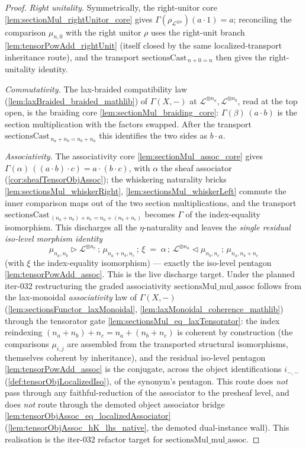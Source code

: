 \begin{proof}
  \emph{Right unitality.} Symmetrically, the right-unitor core
  \cref{lem:sectionMul_rightUnitor_core} gives
  \(\Gamma(\rho_{\mathcal{L}^{\otimes n}})(a \cdot 1) = a\); reconciling the
  comparison \(\mu_{n,0}\) with the right unitor \(\rho\) uses the right-unit branch
  \cref{lem:tensorPowAdd_rightUnit} (itself closed by the same localized-transport
  inheritance route), and the transport \(\mathrm{sectionsCast}_{\,n+0=n}\) then
  gives the right-unitality identity.

  \emph{Commutativity.} The lax-braided compatibility law
  (\cref{lem:laxBraided_braided_mathlib}) of \(\Gamma(X,-)\) at
  \(\mathcal{L}^{\otimes n_a}, \mathcal{L}^{\otimes n_b}\), read at the top open, is
  the braiding core \cref{lem:sectionMul_braiding_core}:
  \(\Gamma(\beta)\,(a \cdot b)\) is the section multiplication with the factors
  swapped. After the transport \(\mathrm{sectionsCast}_{\,n_a+n_b=n_b+n_a}\) this
  identifies the two sides as \(b \cdot a\).

  \emph{Associativity.} The associativity core \cref{lem:sectionMul_assoc_core}
  gives \(\Gamma(\alpha)\,((a \cdot b) \cdot c) = a \cdot (b \cdot c)\), with
  \(\alpha\) the sheaf associator (\cref{cor:sheafTensorObjAssoc}); the whiskering
  naturality bricks \cref{lem:sectionsMul_whiskerRight},
  \cref{lem:sectionsMul_whiskerLeft} commute the inner comparison maps out of the
  two section multiplications, and the transport
  \(\mathrm{sectionsCast}_{\,(n_a+n_b)+n_c = n_a+(n_b+n_c)}\) becomes \(\Gamma\) of
  the index-equality isomorphism. This discharges all the \(\eta\)-naturality and
  leaves the \emph{single residual iso-level morphism identity}
  \[
    \mu_{n_a,n_b} \rhd \mathcal{L}^{\otimes n_c} \,;\, \mu_{n_a+n_b,n_c}
      \,;\, \xi
    \;=\;
    \alpha \,;\, \mathcal{L}^{\otimes n_a} \lhd \mu_{n_b,n_c}
      \,;\, \mu_{n_a,n_b+n_c}
  \]
  (with \(\xi\) the index-equality isomorphism) --- exactly the iso-level pentagon
  \cref{lem:tensorPowAdd_assoc}. This is the live discharge target. Under the
  planned iter-032 restructuring the graded associativity
  \(\mathrm{sectionsMul\_mul\_assoc}\) follows from the lax-monoidal
  \emph{associativity} law of \(\Gamma(X,-)\)
  (\cref{lem:sectionsFunctor_laxMonoidal}, \cref{lem:laxMonoidal_coherence_mathlib})
  through the tensorator gate \cref{lem:sectionsMul_eq_laxTensorator}: the index
  reindexing \((n_a+n_b)+n_c = n_a+(n_b+n_c)\) is coherent by construction (the
  comparisons \(\mu_{i,j}\) are assembled from the transported structural
  isomorphisms, themselves coherent by inheritance), and the residual iso-level
  pentagon \cref{lem:tensorPowAdd_assoc} is the conjugate, across the object
  identifications \(i_{-,-}\) (\cref{def:tensorObjLocalizedIso}), of the synonym's
  pentagon. This route does \emph{not} pass through any faithful-reduction of the
  associator to the presheaf level, and does \emph{not} route through the demoted
  object associator bridge \cref{lem:tensorObjAssoc_eq_localizedAssociator}
  (\cref{lem:tensorObjAssoc_hK_lhs_native}, the demoted dual-instance wall). This
  realisation is the iter-032 refactor target for
  \(\mathrm{sectionsMul\_mul\_assoc}\).
\end{proof}

